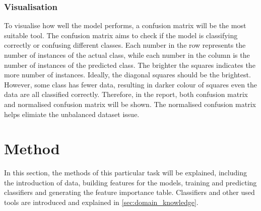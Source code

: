 \documentclass[10pt, a4paper, twocolumn]{article} %
\begin{document}
\subsubsection{Visualisation}
To visualise how well the model performs, a confusion matrix will be the most suitable tool. The confusion matrix aims 
to check if the model is classifying correctly or confusing different classes. Each number in the row represents the 
number of instances of the actual class, while each number in the column is the number of instances of the predicted 
class. The brighter the squares indicates the more number of instances. Ideally, the diagonal squares should be the 
brightest. However, some class has fewer data, resulting in darker colour of squares even the data are all classified 
correctly. Therefore, in the report, both confusion matrix and normalised confusion matrix will be shown. The normalised 
confusion matrix helps elimiate the unbalanced dataset issue. 
\section{Method}
In this section, the methods of this particular task will be explained, including the introduction of data, building 
features for the models, training and predicting classifiers and generating the feature importance table. 
Classifiers and other used tools are introduced and explained in \autoref{sec:domain_knowledge}.
\end{document}

